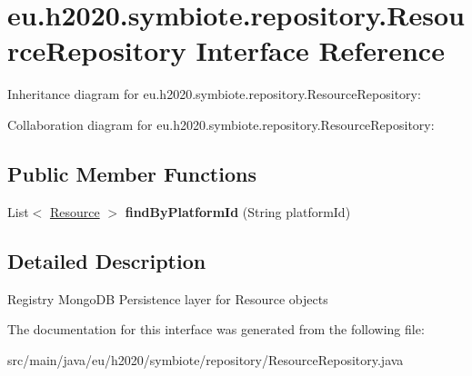\hypertarget{interfaceeu_1_1h2020_1_1symbiote_1_1repository_1_1ResourceRepository}{}\section{eu.\+h2020.\+symbiote.\+repository.\+Resource\+Repository Interface Reference}
\label{interfaceeu_1_1h2020_1_1symbiote_1_1repository_1_1ResourceRepository}


Inheritance diagram for eu.\+h2020.\+symbiote.\+repository.\+Resource\+Repository\+:


Collaboration diagram for eu.\+h2020.\+symbiote.\+repository.\+Resource\+Repository\+:
\subsection*{Public Member Functions}
\begin{DoxyCompactItemize}
\item 
List$<$ \hyperlink{classeu_1_1h2020_1_1symbiote_1_1model_1_1Resource}{Resource} $>$ {\bfseries find\+By\+Platform\+Id} (String platform\+Id)\hypertarget{interfaceeu_1_1h2020_1_1symbiote_1_1repository_1_1ResourceRepository_aec7bce58cf66e21ad20c28041306c089}{}\label{interfaceeu_1_1h2020_1_1symbiote_1_1repository_1_1ResourceRepository_aec7bce58cf66e21ad20c28041306c089}

\end{DoxyCompactItemize}


\subsection{Detailed Description}
Registry Mongo\+DB Persistence layer for Resource objects 

The documentation for this interface was generated from the following file\+:\begin{DoxyCompactItemize}
\item 
src/main/java/eu/h2020/symbiote/repository/Resource\+Repository.\+java\end{DoxyCompactItemize}
